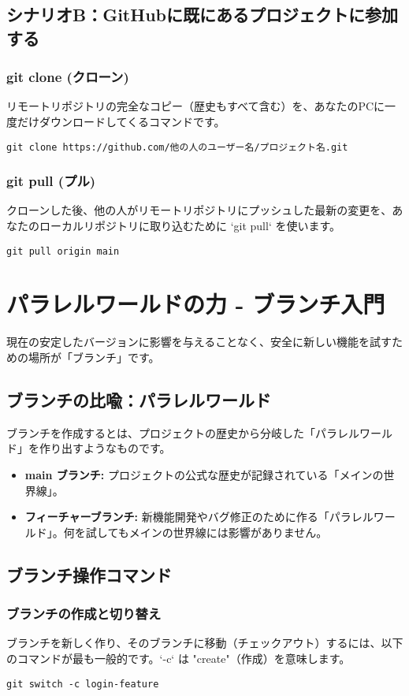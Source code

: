 \documentclass{ltjsarticle}
\begin{document}
\subsection{シナリオB：GitHubに既にあるプロジェクトに参加する}
\subsubsection{git clone (クローン)}
リモートリポジトリの完全なコピー（歴史もすべて含む）を、あなたのPCに一度だけダウンロードしてくるコマンドです。
\begin{verbatim}
git clone https://github.com/他の人のユーザー名/プロジェクト名.git
\end{verbatim}

\subsubsection{git pull (プル)}
クローンした後、他の人がリモートリポジトリにプッシュした最新の変更を、あなたのローカルリポジトリに取り込むために `git pull` を使います。
\begin{verbatim}
git pull origin main
\end{verbatim}

\section{パラレルワールドの力 - ブランチ入門}
現在の安定したバージョンに影響を与えることなく、安全に新しい機能を試すための場所が「ブランチ」です。

\subsection{ブランチの比喩：パラレルワールド}
ブランチを作成するとは、プロジェクトの歴史から分岐した「パラレルワールド」を作り出すようなものです。
\begin{itemize}
    \item \textbf{main ブランチ:} プロジェクトの公式な歴史が記録されている「メインの世界線」。
    \item \textbf{フィーチャーブランチ:} 新機能開発やバグ修正のために作る「パラレルワールド」。何を試してもメインの世界線には影響がありません。
\end{itemize}

\subsection{ブランチ操作コマンド}
\subsubsection{ブランチの作成と切り替え}
ブランチを新しく作り、そのブランチに移動（チェックアウト）するには、以下のコマンドが最も一般的です。`-c` は "create"（作成）を意味します。
\begin{verbatim}
git switch -c login-feature
\end{verbatim}
\end{document}
